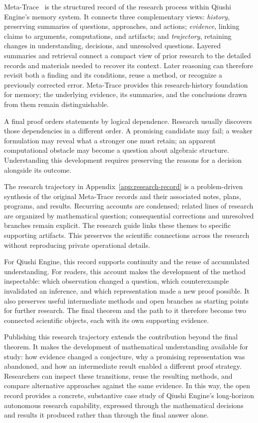 Meta-Trace~\cite{yang2026optical} is the structured record of the research process within
Qiushi Engine's memory system. It connects three complementary views:
\emph{history}, preserving summaries of questions, approaches, and actions;
\emph{evidence}, linking claims to arguments, computations, and artifacts;
and \emph{trajectory}, retaining changes in understanding, decisions, and
unresolved questions. Layered summaries and retrieval connect a compact
view of prior research to the detailed records and materials needed to
recover its context. Later reasoning can therefore revisit both a finding
and its conditions, reuse a method, or recognize a previously corrected
error. Meta-Trace provides this research-history foundation for memory;
the underlying evidence, its summaries, and the conclusions drawn from
them remain distinguishable.

A final proof orders statements by logical dependence. Research usually
discovers those dependencies in a different order. A promising candidate
may fail; a weaker formulation may reveal what a stronger one must retain;
an apparent computational obstacle may become a question about algebraic
structure. Understanding this development requires preserving the reasons
for a decision alongside its outcome.

The research trajectory in Appendix~\ref{app:research-record} is a
problem-driven synthesis of the original Meta-Trace records and their
associated notes, plans, programs, and results. Recurring accounts are
condensed; related lines of research are organized by mathematical question;
consequential corrections and unresolved branches remain explicit.
The research guide links these themes to specific supporting artifacts.
This preserves the scientific connections across the research without
reproducing private operational details.

For Qiushi Engine, this record supports continuity and the reuse of
accumulated understanding. For readers, this account makes the
development of the method inspectable: which observation changed a question,
which counterexample invalidated an inference, and which representation
made a new proof possible. It also preserves useful intermediate methods
and open branches as starting points for further research. The final
theorem and the path to it therefore become two connected scientific
objects, each with its own supporting evidence.

Publishing this research trajectory extends the contribution beyond the
final theorem. It makes the development of mathematical understanding
available for study: how evidence changed a conjecture, why a promising
representation was abandoned, and how an intermediate result enabled a
different proof strategy. Researchers can inspect these transitions,
reuse the resulting methods, and compare alternative approaches against
the same evidence. In this way, the open record provides a concrete,
substantive case study of Qiushi Engine's long-horizon autonomous research
capability, expressed through the mathematical decisions and results it
produced rather than through the final answer alone.

